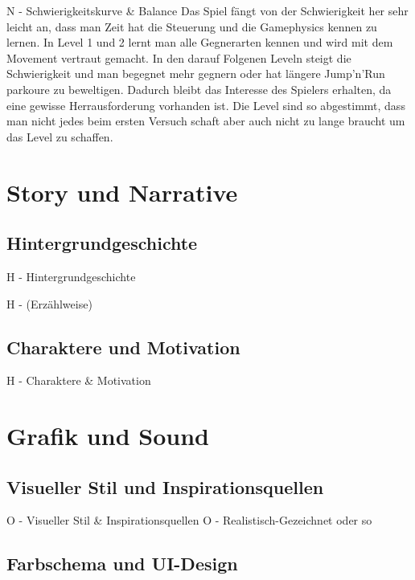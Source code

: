 \documentclass[oneside]{ausarbeitung}
\begin{document}
N - Schwierigkeitskurve & Balance
Das Spiel fängt von der Schwierigkeit her sehr leicht an, dass man Zeit hat die Steuerung und die Gamephysics kennen zu lernen. 
In Level 1 und 2 lernt man alle Gegnerarten kennen und wird mit dem Movement vertraut gemacht. 
In den darauf Folgenen Leveln steigt die Schwierigkeit und man begegnet mehr gegnern oder hat längere Jump'n'Run parkoure zu beweltigen. 
Dadurch bleibt das Interesse des Spielers erhalten, da eine gewisse Herrausforderung vorhanden ist. 
Die Level sind so abgestimmt, dass man nicht jedes beim ersten Versuch schaft aber auch nicht zu lange braucht um das Level zu schaffen. 


\chapter{Story und Narrative}

\section{Hintergrundgeschichte}

H - Hintergrundgeschichte


H - (Erzählweise)


\section{Charaktere und Motivation}

H - Charaktere & Motivation


\chapter{Grafik und Sound}

\section{Visueller Stil und Inspirationsquellen}

O - Visueller Stil & Inspirationsquellen
O   - Realistisch-Gezeichnet oder so


\section{Farbschema und UI-Design}
\end{document}
